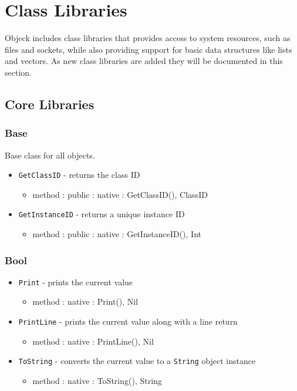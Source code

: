 \documentclass[12pt]{article}
\begin{document}
\section{Class Libraries}
Objeck includes class libraries that provides access to system resources, such as files and sockets, while also providing support for  basic data structures like lists and vectors.  As new class libraries are added they will be documented in this section.

\subsection{Core Libraries}
\subsubsection{Base}
Base class for all objects.
\begin{itemize}
\item \texttt{GetClassID} - returns the class ID
  \begin{itemize}
  \item method : public : native : GetClassID(), ClassID
  \end{itemize}
\item \texttt{GetInstanceID} - returns a unique instance ID
  \begin{itemize}
  \item method : public : native : GetInstanceID(), Int
  \end{itemize}
\end{itemize}

\subsubsection{Bool}
\begin{itemize}
\item \texttt{Print} - prints the current value
  \begin{itemize}
  \item method : native : Print(), Nil
  \end{itemize}
\item \texttt{PrintLine} - prints the current value along with a line return
  \begin{itemize}
  \item method : native : PrintLine(), Nil
  \end{itemize} 
\item \texttt{ToString} - converts the current value to a \texttt{String} object instance
  \begin{itemize}
  \item method : native : ToString(), String
  \end{itemize}
\end{itemize}
\end{document}
